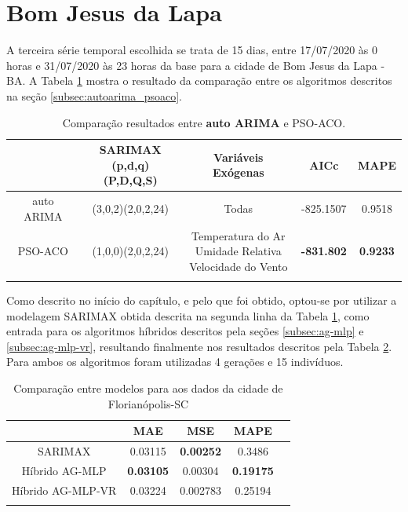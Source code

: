 \section{Bom Jesus da Lapa}

A terceira série temporal escolhida se trata de 15 dias, entre 17/07/2020 às 0 horas e 31/07/2020 às 23 horas da base para a cidade de Bom Jesus da Lapa - BA. A Tabela \ref{tab:cap4_comp_bjl_autoarima_psoaco} mostra o resultado da comparação entre os algoritmos descritos na seção \ref{subsec:autoarima_psoaco}.

\begin{table}[htbp]
\caption{Comparação resultados entre \textbf{auto ARIMA} e PSO-ACO.}
\begin{center}
\begin{tabular}{ccccc}
                    & \Longstack{SARIMAX \\ (p,d,q)(P,D,Q,S)} & Variáveis Exógenas & AICc & MAPE  \\\hline
auto ARIMA & (3,0,2)(2,0,2,24) & Todas & -825.1507 & 0.9518 \\\hline
PSO-ACO             & (1,0,0)(2,0,2,24) & \Longstack{Temperatura do Ar \\ Umidade Relativa \\ Velocidade do Vento} & \textbf{-831.802} & \textbf{0.9233} \\\hline
\label{tab:cap4_comp_bjl_autoarima_psoaco}
\end{tabular}
\end{center}
\end{table}

Como descrito no início do capítulo, e pelo que foi obtido, optou-se por utilizar a modelagem SARIMAX obtida descrita na segunda linha da Tabela \ref{tab:cap4_comp_bjl_autoarima_psoaco}, como entrada para os algoritmos híbridos descritos pela seções \ref{subsec:ag-mlp} e \ref{subsec:ag-mlp-vr}, resultando finalmente nos resultados descritos pela Tabela \ref{tab:cap4_comp_bjl_agmlp_agmlpvr}. Para ambos os algoritmos foram utilizadas 4 gerações e 15 indivíduos.

\begin{table}[htbp]
\caption{Comparação entre modelos para aos dados da cidade de Florianópolis-SC}
\begin{center}
\begin{tabular}{ccccc}
                & MAE & MSE & MAPE \\\hline
SARIMAX         & 0.03115 & \textbf{0.00252} & 0.3486 \\\hline
Híbrido AG-MLP  & \textbf{0.03105} & 0.00304 & \textbf{0.19175} \\\hline
Híbrido AG-MLP-VR & 0.03224 & 0.002783 & 0.25194 \\\hline
\label{tab:cap4_comp_bjl_agmlp_agmlpvr}
\end{tabular}
\end{center}
\end{table}

